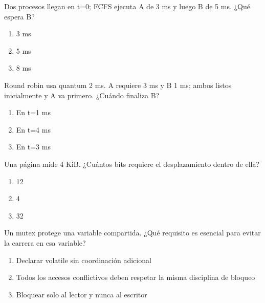 \noindent\begin{minipage}{\linewidth}\setlength{\parskip}{4pt}\label{q:S-043}
Dos procesos llegan en t=0; FCFS ejecuta A de 3 ms y luego B de 5 ms. ¿Qué espera B?
\begin{enumerate}[label=\Alph*),nosep]
\item 3 ms
\item 5 ms
\item 8 ms
\end{enumerate}\end{minipage}\par\medskip

\noindent\begin{minipage}{\linewidth}\setlength{\parskip}{4pt}\label{q:S-044}
Round robin usa quantum 2 ms. A requiere 3 ms y B 1 ms; ambos listos inicialmente y A va primero. ¿Cuándo finaliza B?
\begin{enumerate}[label=\Alph*),nosep]
\item En t=1 ms
\item En t=4 ms
\item En t=3 ms
\end{enumerate}\end{minipage}\par\medskip

\noindent\begin{minipage}{\linewidth}\setlength{\parskip}{4pt}\label{q:S-045}
Una página mide 4 KiB. ¿Cuántos bits requiere el desplazamiento dentro de ella?
\begin{enumerate}[label=\Alph*),nosep]
\item 12
\item 4
\item 32
\end{enumerate}\end{minipage}\par\medskip

\noindent\begin{minipage}{\linewidth}\setlength{\parskip}{4pt}\label{q:S-046}
Un mutex protege una variable compartida. ¿Qué requisito es esencial para evitar la carrera en esa variable?
\begin{enumerate}[label=\Alph*),nosep]
\item Declarar volatile sin coordinación adicional
\item Todos los accesos conflictivos deben respetar la misma disciplina de bloqueo
\item Bloquear solo al lector y nunca al escritor
\end{enumerate}\end{minipage}\par\medskip

